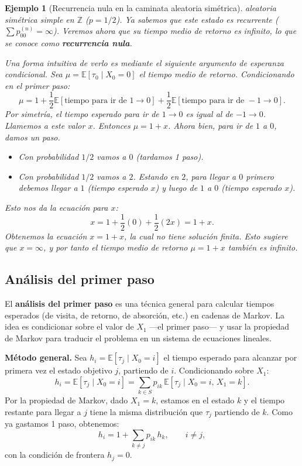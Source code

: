 \documentclass[12pt]{book}
\newtheorem{example}{Ejemplo}[chapter]
\begin{document}
\begin{example}[Recurrencia nula en la caminata aleatoria simétrica]
\label{ej:caminata_nula} aleatoria simétrica simple en $\mathbb{Z}$ ($p=1/2$).
Ya sabemos que este estado es recurrente ($\sum p_{00}^{(n)} = \infty$). Veremos ahora que su tiempo medio de retorno es infinito, lo que se conoce como \textbf{recurrencia nula}.

Una forma intuitiva de verlo es mediante el siguiente argumento de esperanza condicional.
Sea $\mu = \mathbb{E}[\tau_0 \mid X_0=0]$ el tiempo medio de retorno. Condicionando en el primer paso:
\[
\mu = 1 + \frac{1}{2}\mathbb{E}[\text{tiempo para ir de } 1 \to 0] + \frac{1}{2}\mathbb{E}[\text{tiempo para ir de } -1 \to 0].
\]
Por simetría, el tiempo esperado para ir de $1 \to 0$ es igual al de $-1 \to 0$. Llamemos a este valor $x$. Entonces $\mu = 1 + x$.
Ahora bien, para ir de $1$ a $0$, damos un paso.
\begin{itemize}
    \item Con probabilidad $1/2$ vamos a $0$ (tardamos 1 paso).
    \item Con probabilidad $1/2$ vamos a $2$. Estando en $2$, para llegar a $0$ primero debemos llegar a $1$ (tiempo esperado $x$) y luego de $1$ a $0$ (tiempo esperado $x$).
\end{itemize}
Esto nos da la ecuación para $x$:
\[
x = 1 + \frac{1}{2}(0) + \frac{1}{2}(2x) = 1 + x.
\]
Obtenemos la ecuación $x = 1 + x$, la cual no tiene solución finita. Esto sugiere que $x = \infty$, y por tanto el tiempo medio de retorno $\mu = 1 + x$ también es infinito.
\end{example}

\subsection{Análisis del primer paso}

El \textbf{análisis del primer paso} es una técnica general para calcular tiempos esperados (de visita, de retorno, de absorción, etc.) en cadenas de Markov. La idea es condicionar sobre el valor de $X_1$ ---el primer paso--- y usar la propiedad de Markov para traducir el problema en un sistema de ecuaciones lineales.

\textbf{Método general.} Sea $h_i = \mathbb{E}[\tau_j \mid X_0 = i]$ el tiempo esperado para alcanzar por primera vez el estado objetivo $j$, partiendo de $i$. Condicionando sobre $X_1$:
\[
h_i = \mathbb{E}[\tau_j \mid X_0 = i] = \sum_{k \in S} p_{ik} \,\mathbb{E}[\tau_j \mid X_0 = i,\, X_1 = k].
\]
Por la propiedad de Markov, dado $X_1 = k$, estamos en el estado $k$ y el tiempo restante para llegar a $j$ tiene la misma distribución que $\tau_j$ partiendo de $k$. Como ya gastamos 1 paso, obtenemos:
\[
h_i = 1 + \sum_{k \neq j} p_{ik}\, h_k, \qquad i \neq j,
\]
con la condición de frontera $h_j = 0$.
\end{document}
